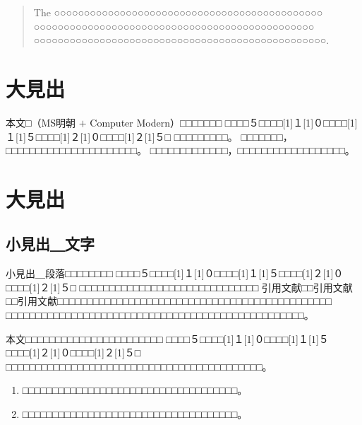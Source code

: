 \documentclass[platex,fleqn]{ieej-tec2}%
\begin{document}
%
\begin{abstract}
The ○○○○○○○○○○○○○○○○○○○○○○○○○○○○○○○○○○○○○○○○○○○○○
○○○○○○○○○○○○○○○○○○○○○○○○○○○○○○○○○○○○○○○○○○○○○○○
○○○○○○○○○○○○○○○○○○○○○○○○○○○○○○○○○○○○○○○○○○○○○○○○○.%
\end{abstract}
\maketitle

%
%
\section{大見出}
本文□（MS明朝 $+$ Computer Modern）□□□□□□□
□□□□５□□□□\scalebox{0.5}[1]{１}\scalebox{0.5}[1]{０}□□□□\scalebox{0.5}[1]{１}\scalebox{0.5}[1]{５}□□□□\scalebox{0.5}[1]{２}\scalebox{0.5}[1]{０}□□□□\scalebox{0.5}[1]{２}\scalebox{0.5}[1]{５}□
□□□□□□□□□。
□□□□□□□，□□□□□□□□□□□□□□□□□□□□□□。
□□□□□□□□□□□□□，□□□□□□□□□□□□□□□□□□。

\section{大見出}

\subsection{小見出＿文字}
小見出＿段落□□□□□□□□
□□□□５□□□□\scalebox{0.5}[1]{１}\scalebox{0.5}[1]{０}□□□□\scalebox{0.5}[1]{１}\scalebox{0.5}[1]{５}□□□□\scalebox{0.5}[1]{２}\scalebox{0.5}[1]{０}□□□□\scalebox{0.5}[1]{２}\scalebox{0.5}[1]{５}□
□□□□□□□□□□□□□□□□□□□□□□□□□□□□□□
引用文献\cite{IEEJformat}□□引用文献\cite{bib2,bib3}□□引用文献\cite{bib4,bib5,bib6,bib7}□□□□□□□□□□□□□□□□□□□□□□□□□□□□□□□□□□□□□□□□□□□□□□
□□□□□□□□□□□□□□□□□□□□□□□□□□□□□□□□□□□□□□□□□□□□□□□□□□。

本文□□□□□□□□□□□□□□□□□□□□□□□
□□□□５□□□□\scalebox{0.5}[1]{１}\scalebox{0.5}[1]{０}□□□□\scalebox{0.5}[1]{１}\scalebox{0.5}[1]{５}□□□□\scalebox{0.5}[1]{２}\scalebox{0.5}[1]{０}□□□□\scalebox{0.5}[1]{２}\scalebox{0.5}[1]{５}□
□□□□□□□□□□□□□□□□□□□□□□□□□□□□□□□□□□□□□□□□□□□。
\begin{enumerate}
\item
□□□□□□□□□□□□□□□□□□□□□□□□□□□□□□□□□□□□。
\item
□□□□□□□□□□□□□□□□□□□□□□□□□□□□□□□□□□□□。
\end{enumerate}
\end{document}
